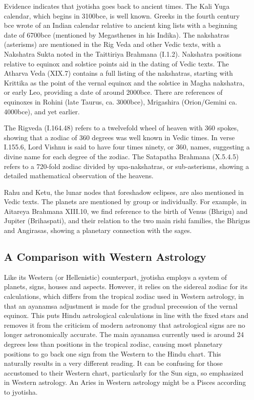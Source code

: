 Evidence indicates that jyotisha goes back to ancient times. The Kali Yuga calendar, which begins in 3100bce, is well known. Greeks in the fourth century bce wrote of an Indian calendar relative to ancient king lists with a beginning date of 6700bce (mentioned by Megasthenes in his Indika). The nakshatras (asterisms) are mentioned in the Rig Veda and other Vedic texts, with a Nakshatra Sukta noted in the Taittiriya Brahmana (I.1.2). Nakshatra positions relative to equinox and solstice points aid in the dating of Vedic texts. The Atharva Veda (XIX.7) contains a full listing of the nakshatras, starting with Krittika as the point of the vernal equinox and the solstice in Magha nakshatra, or early Leo, providing a date of around 2000bce. There are references of equinoxes in Rohini (late Taurus, ca. 3000bce), Mrigashira (Orion/Gemini ca. 4000bce), and yet earlier.

 

The Rigveda (I.164.48) refers to a twelvefold wheel of heaven with 360 spokes, showing that a zodiac of 360 degrees was well known in Vedic times. In verse I.155.6, Lord Vishnu is said to have four times ninety, or 360, names, suggesting a divine name for each degree of the zodiac. The Satapatha Brahmana (X.5.4.5) refers to a 720-fold zodiac divided by upa-nakshatras, or sub-asterisms, showing a detailed mathematical observation of the heavens.

 

Rahu and Ketu, the lunar nodes that foreshadow eclipses, are also mentioned in Vedic texts. The planets are mentioned by group or individually. For example, in Aitareya Brahmana XIII.10, we find reference to the birth of Venus (Bhrigu) and Jupiter (Brihaspati), and their relation to the two main rishi families, the Bhrigus and Angirasas, showing a planetary connection with the sages.

 

\subsection{A Comparison with Western Astrology}
 

Like its Western (or Hellenistic) counterpart, jyotisha employs a system of planets, signs, houses and aspects. However, it relies on the sidereal zodiac for its calculations, which differs from the tropical zodiac used in Western astrology, in that an ayanamsa adjustment is made for the gradual precession of the vernal equinox. This puts Hindu astrological calculations in line with the fixed stars and removes it from the criticism of modern astronomy that astrological signs are no longer astronomically accurate. The main ayanamsa currently used is around 24 degrees less than positions in the tropical zodiac, causing most planetary positions to go back one sign from the Western to the Hindu chart. This naturally results in a very different reading. It can be confusing for those accustomed to their Western chart, particularly for the Sun sign, so emphasized in Western astrology. An Aries in Western astrology might be a Pisces according to jyotisha.

